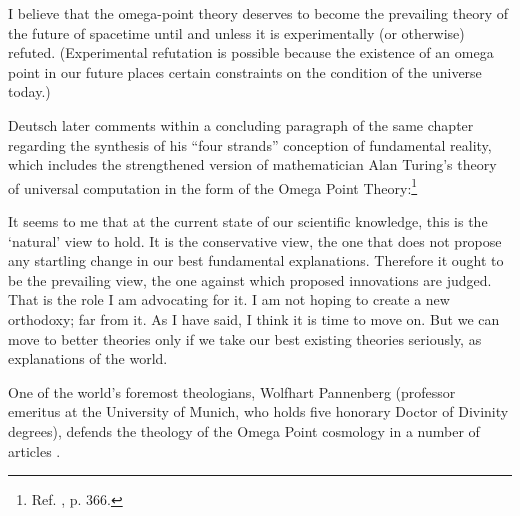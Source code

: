 \documentclass[letterpaper,12pt]{article}
\newenvironment{squote}
  {\small\quote}
  {\endquote\normalsize}
\begin{document}
\begin{squote}
I believe that the omega-point theory deserves to become the prevailing theory of the future of spacetime until and unless it is experimentally (or otherwise) refuted. (Experimental refutation is possible because the existence of an omega point in our future places certain constraints on the condition of the universe today.)
\end{squote}

Deutsch later comments within a concluding paragraph of the same chapter regarding the synthesis of his ``four strands'' conception of fundamental reality, which includes the strengthened version of mathematician Alan Turing's theory of universal computation in the form of the Omega Point Theory:\footnote{Ref. , p. 366.}

\begin{squote}
It seems to me that at the current state of our scientific knowledge, this is the `natural' view to hold. It is the conservative view, the one that does not propose any startling change in our best fundamental explanations. Therefore it ought to be the prevailing view, the one against which proposed innovations are judged. That is the role I am advocating for it. I am not hoping to create a new orthodoxy; far from it. As I have said, I think it is time to move on. But we can move to better theories only if we take our best existing theories seriously, as explanations of the world.
\end{squote}

One of the world's foremost theologians, Wolfhart Pannenberg (professor emeritus at the University of Munich, who holds five honorary Doctor of Divinity degrees), defends the theology of the Omega Point cosmology in a number of articles \cite{Pannenberg1989,Pannenberg1995,Pannenberg1997,Pannenberg2003}.
\end{document}
